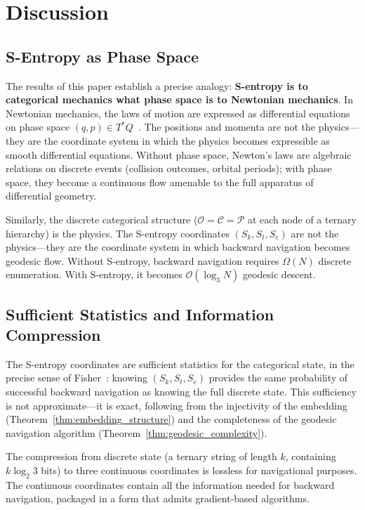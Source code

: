 \documentclass[12pt,twocolumn]{article}
\begin{document}
\section{Discussion}
\label{sec:discussion}

\subsection{S-Entropy as Phase Space}

The results of this paper establish a precise analogy: \textbf{S-entropy is to categorical mechanics what phase space is to Newtonian mechanics}. In Newtonian mechanics, the laws of motion are expressed as differential equations on phase space $(q, p) \in T^*Q$~\cite{arnold1978mathematical}. The positions and momenta are not the physics---they are the coordinate system in which the physics becomes expressible as smooth differential equations. Without phase space, Newton's laws are algebraic relations on discrete events (collision outcomes, orbital periods); with phase space, they become a continuous flow amenable to the full apparatus of differential geometry.

Similarly, the discrete categorical structure ($\mathcal{O} = \mathcal{C} = \mathcal{P}$ at each node of a ternary hierarchy) is the physics. The S-entropy coordinates $(S_k, S_t, S_e)$ are not the physics---they are the coordinate system in which backward navigation becomes geodesic flow. Without S-entropy, backward navigation requires $\Omega(N)$ discrete enumeration. With S-entropy, it becomes $\mathcal{O}(\log_3 N)$ geodesic descent.

\subsection{Sufficient Statistics and Information Compression}

The S-entropy coordinates are sufficient statistics for the categorical state, in the precise sense of Fisher~\cite{fisher1922mathematical}: knowing $(S_k, S_t, S_e)$ provides the same probability of successful backward navigation as knowing the full discrete state. This sufficiency is not approximate---it is exact, following from the injectivity of the embedding (Theorem~\ref{thm:embedding_structure}) and the completeness of the geodesic navigation algorithm (Theorem~\ref{thm:geodesic_complexity}).

The compression from discrete state (a ternary string of length $k$, containing $k \log_2 3$ bits) to three continuous coordinates is lossless for navigational purposes. The continuous coordinates contain all the information needed for backward navigation, packaged in a form that admits gradient-based algorithms.
\end{document}
